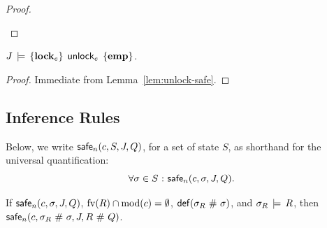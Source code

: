 \documentclass[11pt]{report}         %
\begin{document}
\begin{proof}
\begin{enumerate}
    \end{enumerate}
\end{proof}

\begin{lemma}
    \label{lem:unlock-sound}
    $J\,\models\,\left\lbrace \mathbf{lock}_{e} \right\rbrace\;\operatorname{\mathsf{unlock}}_{e}\;\left\lbrace \mathbf{emp} \right\rbrace$. 
\end{lemma} 

\begin{proof}
    Immediate from Lemma~\ref{lem:unlock-safe}. 
\end{proof}

\subsection{Inference Rules}

Below, we write $\mathsf{safe}_{n}(c,S,J,Q)$, for a set of state $S$, as shorthand for the universal quantification: \[ \forall \sigma \in S \operatorname{\,:\,} \mathsf{safe}_{n}(c,\sigma,J,Q).\]

\begin{lemma}
      \label{lem:weak-interleaving-safe}
      If $\mathsf{safe}_{n}(c,\sigma,J,Q)$, $\mathrm{fv}(R) \cap \mathrm{mod}(c) = \operatorname{\emptyset}$, $\mathsf{def}(\sigma_R \operatorname{\,\#\,} \sigma)$, and $\sigma_R \,\models\, R$, then $\mathsf{safe}_{n}(c, \sigma_R \operatorname{\,\#\,} \sigma,J,R \operatorname{\,\#\,} Q)$. 
\end{lemma}
\end{document}
